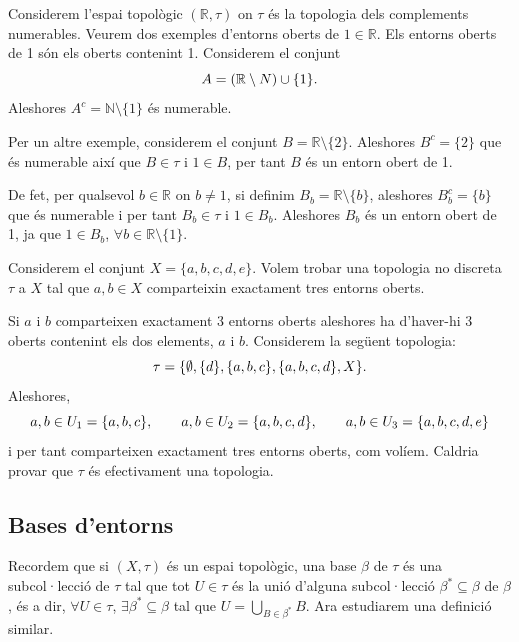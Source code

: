 \documentclass[../main.tex]{subfiles}
\begin{document}
\begin{ej}
\label{ej:entorn6} Considerem l'espai topològic $(\mathbb{R},\tau)$ on $\tau$ és la topologia dels complements numerables. Veurem dos exemples d'entorns oberts de $1\in\mathbb{R}$. Els entorns oberts de 1 són els oberts contenint 1. Considerem el conjunt
\begin{equation}
    \notag
    A = (\mathbb{R}\setminus N)\cup\{1\} .
\end{equation}
Aleshores $A^c = \mathbb{N}\setminus\{1\}$ és numerable.

Per un altre exemple, considerem el conjunt $B = \mathbb{R}\setminus\{2\}$. Aleshores $B^c = \{2\}$ que és numerable així que $B\in\tau$ i $1\in B$, per tant $B$ és un entorn obert de 1.

De fet, per qualsevol $b\in\mathbb{R}$ on $b\not=1$, si definim $B_b = \mathbb{R}\setminus\{b\}$, aleshores $B_b^c = \{b\}$ que és numerable i per tant $B_b\in\tau$ i $1\in B_b$. Aleshores $B_b$ és un entorn obert de 1, ja que $1\in B_b$, $\forall b\in\mathbb{R}\setminus\{1\}$.
\end{ej}

\begin{ej}
\label{ej:entorn7} Considerem el conjunt $X = \{a,b,c,d,e\}$. Volem trobar una topologia no discreta $\tau$ a $X$ tal que $a,b\in X$ comparteixin exactament tres entorns oberts.

Si $a$ i $b$ comparteixen exactament 3 entorns oberts aleshores ha d'haver-hi 3 oberts contenint els dos elements, $a$ i $b$. Considerem la següent topologia:
\begin{equation}
    \notag
    \tau = \{\emptyset,\{d\},\{a,b,c\},\{a,b,c,d\},X\} .
\end{equation}
Aleshores,
\begin{equation}
    \notag
    a,b\in U_1 = \{a,b,c\},\qquad a,b\in U_2 = \{a,b,c,d\},\qquad a,b\in U_3 = \{a,b,c,d,e\}
\end{equation}
i per tant comparteixen exactament tres entorns oberts, com volíem. Caldria provar que $\tau$ és efectivament una topologia.
\end{ej}

\subsection{Bases d'entorns}

Recordem que si $(X,\tau)$ és un espai topològic, una base $\beta$ de $\tau$ és una subcol·lecció de $\tau$ tal que tot $U\in\tau$ és la unió d'alguna subcol·lecció $\beta^*\subseteq \beta$ de $\beta$, és a dir, $\forall U\in\tau$, $\exists \beta^*\subseteq\beta$ tal que $U = \bigcup_{B\in\beta^*}B$. Ara estudiarem una definició similar.
\end{document}
